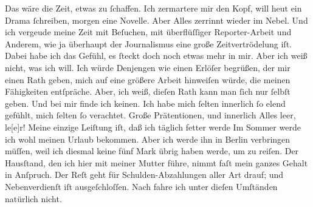 \begin{ledgroupsized}[t]{13cm}
               Das wäre die Zeit, etwas zu ſchaffen. Ich zermartere mir den Kopf, will heut ein
               Drama ſchreiben, morgen eine Novelle. Aber Alles {\pb}zerrinnt wieder im Nebel. Und ich vergeude meine Zeit mit Beſuchen, mit
               überflüſſiger Reporter-Arbeit und Anderem, wie ja überhaupt der Journalismus eine
               große Zeitvertrödelung iſt. Dabei habe ich das Gefühl, es ſteckt doch noch etwas mehr
               in mir. Aber ich weiß nicht, was ich will. Ich würde Denjengen\strikeout{,} wie einen Erlöſer begrüßen, der mir einen Rath geben,
               mich auf eine größere Arbeit hinweiſen würde, die  meinen Fähigkeiten entſpräche. Aber, ich weiß, dieſen Rath kann man ſich nur
               ſelbſt geben. Und bei mir finde ich keinen. Ich habe mich ſelten innerlich ſo elend
               gefühlt, mich ſelten ſo verachtet. Große Prätentionen, und innerlich {\pb}Alles leer, le{[}e{]}r! Meine einzige
               Leiſtung iſt, daß ich täglich fetter werde{\dotsfour}\pend
           \pstart
           Im Sommer werde ich wohl meinen Urlaub bekommen. Aber ich werde ihn in Berlin verbringen müſſen, weil ich diesmal keine
               fünf Mark übrig haben werde, um zu reiſen. Der Hausſtand, den ich hier mit meiner Mutter führe,  nimmt faſt mein ganzes Gehalt in Anſpruch. Der Reſt
               geht für Schulden-Abzahlungen aller Art drauf; und Nebenverdienſt iſt ausgeſchloſſen.
               Nach \label{K_L02911-5v}\label{K_L02911-5h} fahre ich unter dieſen Umſtänden natürlich nicht.\pend
           \pstart

\end{ledgroupsized}
